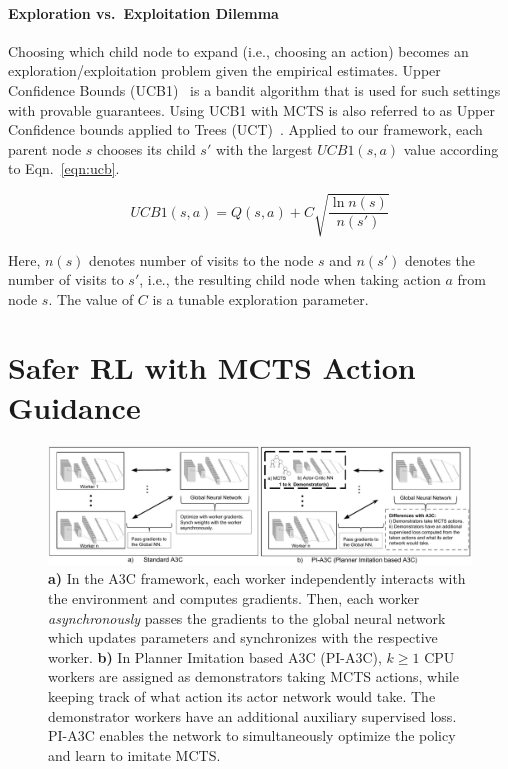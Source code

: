 \documentclass[letterpaper]{article}
\begin{document}
\paragraph{Exploration vs.~Exploitation Dilemma}

Choosing which child node to expand (i.e., choosing an action) becomes an exploration/exploitation problem given the empirical estimates. Upper Confidence Bounds (UCB1)~\cite{auer2002finite} is a bandit algorithm that is used for such settings with provable guarantees. Using UCB1 with MCTS is also referred to as Upper Confidence bounds applied to Trees (UCT)~\cite{kocsis2006bandit}. Applied to our framework, each parent node $s$ chooses its child $s'$ with the largest $UCB1(s,a)$ value according to Eqn.~\ref{eqn:ucb}.

\begin{equation}
UCB1(s,a) = Q(s,a) + C \sqrt{\frac{\ln n(s)}{n(s')}}
\label{eqn:ucb}
\end{equation}

\noindent Here, $n(s)$ denotes number of visits to the node $s$ and $n(s')$ denotes the number of visits to $s'$, i.e., the resulting child node when taking action $a$ from node $s$. The value of $C$ is a tunable exploration parameter.



\section{Safer RL with MCTS Action Guidance}


\begin{figure}
\centering
\includegraphics[width=\linewidth]{A3C_PI-A3C.pdf}
\caption{\textbf{a)} In the A3C framework, each worker independently interacts with the environment and computes gradients. Then, each worker \emph{asynchronously} passes the gradients to the global neural network which updates parameters and synchronizes with the respective worker. \textbf{b)} In Planner Imitation based A3C (PI-A3C), $k\ge 1$ CPU workers are assigned as demonstrators taking MCTS actions, while keeping track of what action its actor network would take. The demonstrator workers have an additional auxiliary supervised loss. PI-A3C enables the network to simultaneously optimize the policy and learn to imitate MCTS.}
\label{fig:pi_a3c}
\end{figure}
\end{document}
